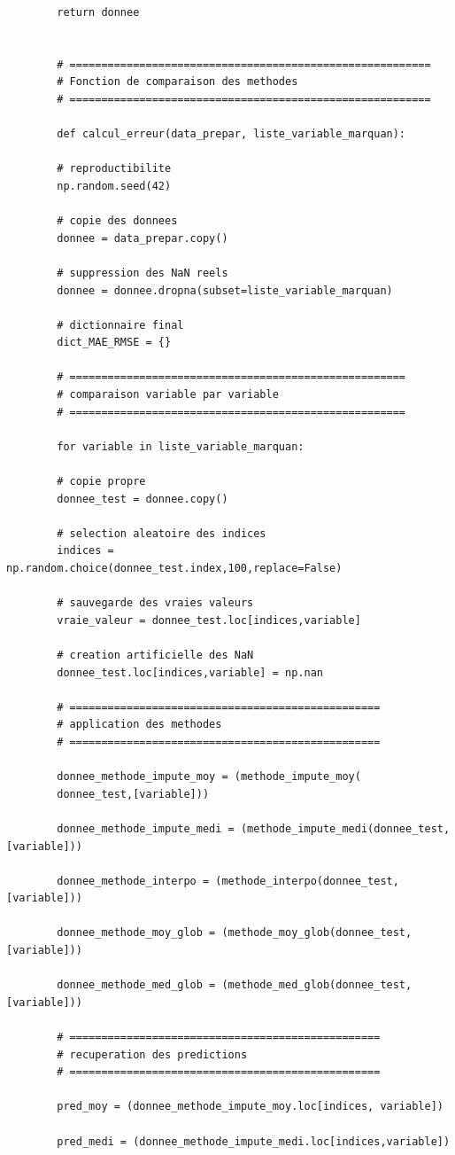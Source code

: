 \documentclass[a4paper,12pt]{report}
\theoremstyle{definition}
\begin{document}
\begin{lstlisting}
		return donnee
		
		
		# =========================================================
		# Fonction de comparaison des methodes
		# =========================================================
		
		def calcul_erreur(data_prepar, liste_variable_marquan):
		
		# reproductibilite
		np.random.seed(42)
		
		# copie des donnees
		donnee = data_prepar.copy()
		
		# suppression des NaN reels
		donnee = donnee.dropna(subset=liste_variable_marquan)
		
		# dictionnaire final
		dict_MAE_RMSE = {}
		
		# =====================================================
		# comparaison variable par variable
		# =====================================================
		
		for variable in liste_variable_marquan:
		
		# copie propre
		donnee_test = donnee.copy()
		
		# selection aleatoire des indices
		indices = np.random.choice(donnee_test.index,100,replace=False)
		
		# sauvegarde des vraies valeurs
		vraie_valeur = donnee_test.loc[indices,variable]
		
		# creation artificielle des NaN
		donnee_test.loc[indices,variable] = np.nan
		
		# =================================================
		# application des methodes
		# =================================================
		
		donnee_methode_impute_moy = (methode_impute_moy(
		donnee_test,[variable]))
		
		donnee_methode_impute_medi = (methode_impute_medi(donnee_test,[variable]))
		
		donnee_methode_interpo = (methode_interpo(donnee_test,[variable]))
		
		donnee_methode_moy_glob = (methode_moy_glob(donnee_test,[variable]))
		
		donnee_methode_med_glob = (methode_med_glob(donnee_test,[variable]))
		
		# =================================================
		# recuperation des predictions
		# =================================================
		
		pred_moy = (donnee_methode_impute_moy.loc[indices, variable])
		
		pred_medi = (donnee_methode_impute_medi.loc[indices,variable])
		

\end{lstlisting}
\end{document}
